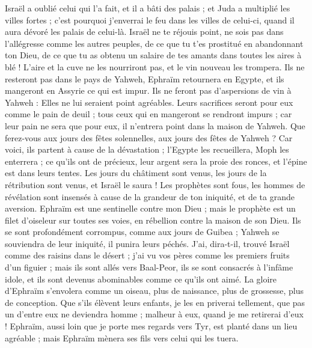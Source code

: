\begin{multicols}{2}
Israël a oublié celui qui l'a fait, et il a bâti des palais ; et Juda a multiplié les villes fortes ; c'est pourquoi j'enverrai le feu dans les villes de celui-ci, quand il aura dévoré les palais de celui-là.
\VerseOne{}Israël ne te réjouis point, ne sois pas dans l’allégresse comme les autres peuples, de ce que tu t’es prostitué en abandonnant ton Dieu, de ce que tu as obtenu un salaire de tes amants dans toutes les aires à blé !
L'aire et la cuve ne les nourriront pas, et le vin nouveau les trompera.
Ils ne resteront pas dans le pays de Yahweh, Ephraïm retournera en Egypte, et ils mangeront en Assyrie ce qui est impur.
Ils ne feront pas d'aspersions de vin à Yahweh : Elles ne lui seraient point agréables. Leurs sacrifices seront pour eux comme le pain de deuil ; tous ceux qui en mangeront se rendront impurs ; car leur pain ne sera que pour eux, il n'entrera point dans la maison de Yahweh.
Que ferez-vous aux jours des fêtes solennelles, aux jours des fêtes de Yahweh ?
Car voici, ils partent à cause de la dévastation ; l'Egypte les recueillera, Moph les enterrera ; ce qu’ils ont de précieux, leur argent sera la proie des ronces, et l'épine est dans leurs tentes.
Les jours du châtiment sont venus, les jours de la rétribution sont venus, et Israël le saura ! Les prophètes sont fous, les hommes de révélation sont insensés à cause de la grandeur de ton iniquité, et de ta grande aversion.
Ephraïm est une sentinelle contre mon Dieu ; mais le prophète est un filet d'oiseleur sur toutes ses voies, en rébellion contre la maison de son Dieu.
Ils se sont profondément corrompus, comme aux jours de Guibea ; Yahweh se souviendra de leur iniquité, il punira leurs péchés.
J’ai, dira-t-il, trouvé Israël comme des raisins dans le désert ; j'ai vu vos pères comme les premiers fruits d’un figuier ; mais ils sont allés vers Baal-Peor, ils se sont consacrés à l’infâme idole, et ils sont devenus abominables comme ce qu'ils ont aimé.
La gloire d'Ephraïm s'envolera comme un oiseau, plus de naissance, plus de grossesse, plus de conception.
Que s'ils élèvent leurs enfants, je les en priverai tellement, que pas un d'entre eux ne deviendra homme ; malheur à eux, quand je me retirerai d'eux !
Ephraïm, aussi loin que je porte mes regards vers Tyr, est planté dans un lieu agréable ; mais Ephraïm mènera ses fils vers celui qui les tuera.

\end{multicols}
